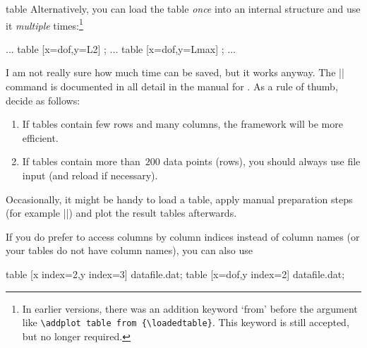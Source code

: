 {\begin{addplotoperation}[]{table}{}
Alternatively, you can load the table \emph{once} into an internal structure
and use it \emph{multiple} times:\footnote{In earlier versions, there was an
addition keyword `from' before the argument like \texttt{\textbackslash addplot
table from \{\textbackslash loadedtable\}}. This keyword is still accepted, but
no longer required.}
%
\begin{codeexample}
\loadedtable %
...
\addplot table [x=dof,y=L2] {\loadedtable};
...
\addplot table [x=dof,y=Lmax] {\loadedtable};
...
\end{codeexample}
%
I am not really sure how much time can be saved, but it works anyway. The
|\pgfplotstableread| command is documented in all detail in the manual for
\PGFPlotstable{}. As a rule of thumb, decide as follows:
%
\begin{enumerate}
    \item If tables contain few rows and many columns, the
         framework will be more efficient.
    \item If tables contain more than~$200$ data points (rows), you should
        always use file input (and reload if necessary).
\end{enumerate}
%
Occasionally, it might be handy to load a table, apply manual preparation steps
(for example |\pgfplotstabletranspose|) and plot the result tables afterwards.

If you do prefer to access columns by column indices instead of column names
(or your tables do not have column names), you can also use
%
\begin{codeexample}
\addplot table [x index=2,y index=3] {datafile.dat};
\addplot table [x=dof,y index=2]     {datafile.dat};
\end{codeexample}


\end{addplotoperation}}
